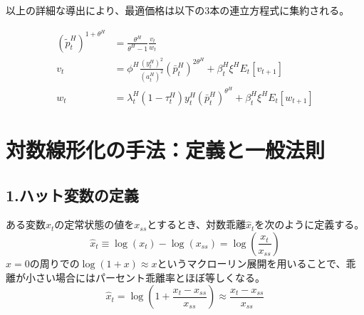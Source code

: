 以上の詳細な導出により、最適価格は以下の3本の連立方程式に集約される。

\begin{align}
(\widetilde{p}_t^H)^{1+\theta^H}&=\frac{\theta^H}{\theta^H-1}\frac{v_t}{w_t} \label{eq:appendix_optimal_price_derivation_foc_sub4_system_p} \\
v_t&=\phi^H\frac{(y_t^H)^2}{(a_t^H)^2}(\bar{p}_t^H)^{2\theta^H}+\beta_t^H\xi^HE_t[v_{t+1}] \label{eq:appendix_optimal_price_derivation_foc_sub4_system_v} \\
w_t&=\lambda_t^H(1-\tau_t^H)y_t^H(\bar{p}_t^H)^{\theta^H}+\beta_t^H\xi^HE_t[w_{t+1}] \label{eq:appendix_optimal_price_derivation_foc_sub4_system_w}
\end{align}

\section{対数線形化の手法：定義と一般法則}
\label{sec:appendix_optimal_price_derivation_log_linearization}

\subsection*{1.ハット変数の定義}
\label{sec:appendix_optimal_price_derivation_log_linearization_def}
ある変数\(x_t\)の定常状態の値を\(x_{ss}\)とするとき、対数乖離\(\hat{x}_t\)を次のように定義する。
\begin{equation}
\hat{x}_t\equiv\log(x_t)-\log(x_{ss})=\log\left(\frac{x_t}{x_{ss}}\right)
\label{eq:appendix_optimal_price_derivation_log_linearization_hat_def}
\end{equation}
\(x=0\)の周りでの\(\log(1+x)\approx x\)というマクローリン展開を用いることで、乖離が小さい場合にはパーセント乖離率とほぼ等しくなる。
\begin{equation}
\hat{x}_t=\log\left(1+\frac{x_t-x_{ss}}{x_{ss}}\right)\approx\frac{x_t-x_{ss}}{x_{ss}}
\label{eq:appendix_optimal_price_derivation_log_linearization_hat_approx}
\end{equation}

